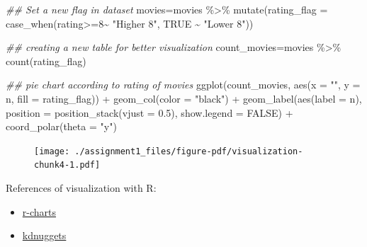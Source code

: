 \documentclass[
  letterpaper,
  DIV=11,
  numbers=noendperiod]{scrreprt}
\newenvironment{Shaded}{\begin{snugshade}}{\end{snugshade}}
\newcommand{\AttributeTok}[1]{\textcolor[rgb]{0.40,0.45,0.13}{#1}}
\newcommand{\ConstantTok}[1]{\textcolor[rgb]{0.56,0.35,0.01}{#1}}
\newcommand{\DecValTok}[1]{\textcolor[rgb]{0.68,0.00,0.00}{#1}}
\newcommand{\DocumentationTok}[1]{\textcolor[rgb]{0.37,0.37,0.37}{\textit{#1}}}
\newcommand{\FloatTok}[1]{\textcolor[rgb]{0.68,0.00,0.00}{#1}}
\newcommand{\FunctionTok}[1]{\textcolor[rgb]{0.28,0.35,0.67}{#1}}
\newcommand{\NormalTok}[1]{\textcolor[rgb]{0.00,0.23,0.31}{#1}}
\newcommand{\OtherTok}[1]{\textcolor[rgb]{0.00,0.23,0.31}{#1}}
\newcommand{\SpecialCharTok}[1]{\textcolor[rgb]{0.37,0.37,0.37}{#1}}
\newcommand{\StringTok}[1]{\textcolor[rgb]{0.13,0.47,0.30}{#1}}
\providecommand{\tightlist}{%
  \setlength{\itemsep}{0pt}\setlength{\parskip}{0pt}}\usepackage{longtable,booktabs,array}
\begin{document}
\begin{Shaded}
\begin{Highlighting}[]
\DocumentationTok{\#\# Set a new flag in dataset}
\NormalTok{movies}\OtherTok{=}\NormalTok{movies }\SpecialCharTok{\%\textgreater{}\%} \FunctionTok{mutate}\NormalTok{(}\AttributeTok{rating\_flag =} \FunctionTok{case\_when}\NormalTok{(rating}\SpecialCharTok{\textgreater{}=}\DecValTok{8}\SpecialCharTok{\textasciitilde{}} \StringTok{"Higher 8"}\NormalTok{, }\ConstantTok{TRUE} \SpecialCharTok{\textasciitilde{}} \StringTok{"Lower 8"}\NormalTok{))}

\DocumentationTok{\#\# creating a new table for better visualization}
\NormalTok{count\_movies}\OtherTok{=}\NormalTok{movies }\SpecialCharTok{\%\textgreater{}\%} \FunctionTok{count}\NormalTok{(rating\_flag)}

\DocumentationTok{\#\# pie chart according to rating of movies}
\FunctionTok{ggplot}\NormalTok{(count\_movies, }\FunctionTok{aes}\NormalTok{(}\AttributeTok{x =} \StringTok{""}\NormalTok{, }\AttributeTok{y =}\NormalTok{ n, }\AttributeTok{fill =}\NormalTok{ rating\_flag)) }\SpecialCharTok{+}
  \FunctionTok{geom\_col}\NormalTok{(}\AttributeTok{color =} \StringTok{"black"}\NormalTok{) }\SpecialCharTok{+}
  \FunctionTok{geom\_label}\NormalTok{(}\FunctionTok{aes}\NormalTok{(}\AttributeTok{label =}\NormalTok{ n),}
             \AttributeTok{position =} \FunctionTok{position\_stack}\NormalTok{(}\AttributeTok{vjust =} \FloatTok{0.5}\NormalTok{),}
             \AttributeTok{show.legend =} \ConstantTok{FALSE}\NormalTok{) }\SpecialCharTok{+}
  \FunctionTok{coord\_polar}\NormalTok{(}\AttributeTok{theta =} \StringTok{"y"}\NormalTok{)}
\end{Highlighting}
\end{Shaded}

\begin{figure}[H]

{\centering \texttt{[image: ./assignment1\_files/figure-pdf/visualization-chunk4-1.pdf]}

}

\end{figure}

References of visualization with R:

\begin{itemize}
\tightlist
\item
  \href{https://r-charts.com/part-whole/pie-chart-ggplot2/}{r-charts}
\item
  \href{https://www.kdnuggets.com/2018/06/7-simple-data-visualizations-should-know-r.html}{kdnuggets}
\end{itemize}
\end{document}
